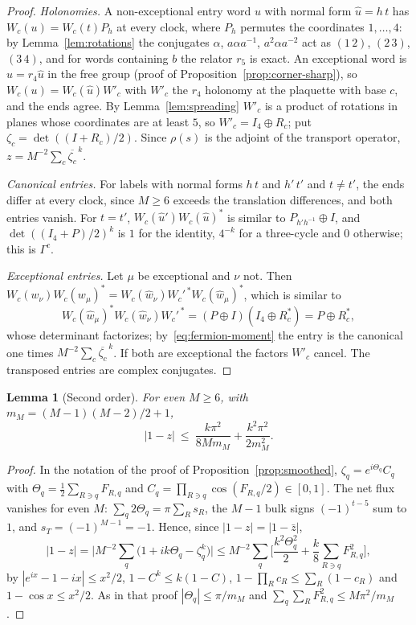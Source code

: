 \documentclass[11pt,a4paper]{article}
\theoremstyle{plain}
\newtheorem{lemma}[theorem]{Lemma}
\theoremstyle{definition}
\theoremstyle{remark}
\begin{document}
\begin{proof}
\emph{Holonomies.} A non-exceptional entry word $u$ with normal form $\hat u=h\,t$ has $W_c(u)=W_c(t)P_h$ at every clock, where $P_h$ permutes the
coordinates $1,\dots,4$: by Lemma~\ref{lem:rotations} the conjugates $\alpha$, $a\alpha a^{-1}$, $a^2\alpha a^{-2}$ act as $(1\,2)$, $(2\,3)$, $(3\,4)$,
and for words containing $b$ the relator $r_5$ is exact. An exceptional word is $u=r_4\hat u$ in the free group (proof of
Proposition~\ref{prop:corner-sharp}), so $W_c(u)=W_c(\hat u)W'_c$ with $W'_c$ the $r_4$ holonomy at the plaquette with base $c$, and the ends agree.
By Lemma~\ref{lem:spreading} $W'_c$ is a product of rotations in planes whose coordinates are at least $5$, so $W'_c=I_4\oplus R_c$; put
$\zeta_c=\det((I+R_c)/2)$. Since $\rho(s)$ is the adjoint of the transport operator, $z=M^{-2}\sum_c\overline{\zeta_c}^{\,k}$.

\emph{Canonical entries.} For labels with normal forms $h\,t$ and $h'\,t'$ and $t\ne t'$, the ends differ at every clock, since $M\ge6$ exceeds the
translation differences, and both entries vanish. For $t=t'$, $W_c(\hat u')W_c(\hat u)^*$ is similar to $P_{h'h^{-1}}\oplus I$, and
$\det((I_4+P)/2)^k$ is $1$ for the identity, $4^{-k}$ for a three-cycle and $0$ otherwise; this is $\Gamma^c$.

\emph{Exceptional entries.} Let $\mu$ be exceptional and $\nu$ not. Then
$W_c(w_\nu)W_c(w_\mu)^*=W_c(\hat w_\nu)W_c'^{\,*}W_c(\hat w_\mu)^*$, which is similar to
\[
W_c(\hat w_\mu)^*W_c(\hat w_\nu)W_c'^{\,*}=(P\oplus I)(I_4\oplus R_c^*)=P\oplus R_c^*,
\]
whose determinant factorizes; by~\eqref{eq:fermion-moment} the entry is the canonical one times $M^{-2}\sum_c\overline{\zeta_c}^{\,k}$. If both are exceptional the factors $W'_c$ cancel. The transposed entries are complex
conjugates.
\end{proof}

\begin{lemma}[Second order]\label{lem:second-order}
For even $M\ge6$, with $m_M=(M-1)(M-2)/2+1$,
\[
|1-z|\ \le\ \frac{k\pi^2}{8Mm_M}+\frac{k^2\pi^2}{2m_M^2}.
\]
\end{lemma}

\begin{proof}
In the notation of the proof of Proposition~\ref{prop:smoothed}, $\zeta_q=e^{i\Theta_q}C_q$ with $\Theta_q=\frac12\sum_{R\ni q}F_{R,q}$ and
$C_q=\prod_{R\ni q}\cos(F_{R,q}/2)\in[0,1]$. The net flux vanishes for even $M$: $\sum_q2\Theta_q=\pi\sum_Rs_R$, the $M-1$ bulk signs $(-1)^{t-5}$ sum to $1$,
and $s_T=(-1)^{M-1}=-1$. Hence, since $|1-z|=|1-\bar z|$,
\[
|1-z|=\Big|M^{-2}\sum_q\big(1+ik\Theta_q-\zeta_q^k\big)\Big|\le M^{-2}\sum_q\Big[\frac{k^2\Theta_q^2}2+\frac k8\sum_{R\ni q}F_{R,q}^2\Big],
\]
by $|e^{ix}-1-ix|\le x^2/2$, $1-C^k\le k(1-C)$, $1-\prod_Rc_R\le\sum_R(1-c_R)$ and $1-\cos x\le x^2/2$. As in that proof $|\Theta_q|\le\pi/m_M$ and
$\sum_q\sum_RF_{R,q}^2\le M\pi^2/m_M$.
\end{proof}
\end{document}
